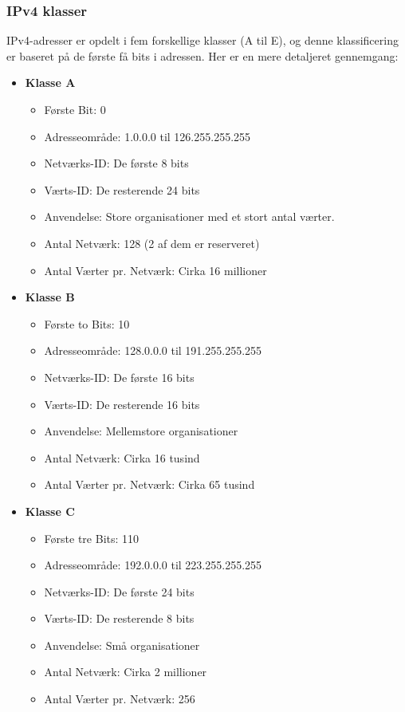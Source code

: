 \subsubsection{IPv4 klasser}
IPv4-adresser er opdelt i fem forskellige klasser (A til E), og denne klassificering er baseret på de første få bits i adressen. Her er en mere detaljeret gennemgang:
\begin{itemize}
	\item[ ] \textbf{Klasse A}
	\begin{itemize}
		\item Første Bit: 0
		\item Adresseområde: 1.0.0.0 til 126.255.255.255
		\item Netværks-ID: De første 8 bits
		\item Værts-ID: De resterende 24 bits
		\item Anvendelse: Store organisationer med et stort antal værter.
		\item Antal Netværk: 128 (2 af dem er reserveret)
		\item Antal Værter pr. Netværk: Cirka 16 millioner
	\end{itemize}
	
	\item[ ] \textbf{Klasse B}
	\begin{itemize}
		\item Første to Bits: 10
		\item Adresseområde: 128.0.0.0 til 191.255.255.255
		\item Netværks-ID: De første 16 bits
		\item Værts-ID: De resterende 16 bits
		\item Anvendelse: Mellemstore organisationer
		\item Antal Netværk: Cirka 16 tusind
		\item Antal Værter pr. Netværk: Cirka 65 tusind
	\end{itemize}
	
	\item[ ] \textbf{Klasse C}
	\begin{itemize}
		\item Første tre Bits: 110
		\item Adresseområde: 192.0.0.0 til 223.255.255.255
		\item Netværks-ID: De første 24 bits
		\item Værts-ID: De resterende 8 bits
		\item Anvendelse: Små organisationer
		\item Antal Netværk: Cirka 2 millioner
		\item Antal Værter pr. Netværk: 256
	\end{itemize}
	

\end{itemize}
